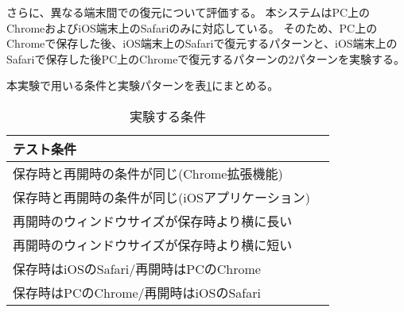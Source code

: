 さらに、異なる端末間での復元について評価する。
本システムはPC上のChromeおよびiOS端末上のSafariのみに対応している。
そのため、PC上のChromeで保存した後、iOS端末上のSafariで復元するパターンと、iOS端末上のSafariで保存した後PC上のChromeで復元するパターンの2パターンを実験する。

本実験で用いる条件と実験パターンを表\ref{tb:evl-scroll-position}にまとめる。

\begin{table}[htbp]
  \label{tb:evl-scroll-position}
  \caption{実験する条件}
  \begin{center}
    \begin{tabular}{|l|l|}
    \hline
    テスト条件  \\\hline\hline
    保存時と再開時の条件が同じ(Chrome拡張機能) \\ \hline
    保存時と再開時の条件が同じ(iOSアプリケーション) \\ \hline
    再開時のウィンドウサイズが保存時より横に長い  \\ \hline
    再開時のウィンドウサイズが保存時より横に短い  \\ \hline
    保存時はiOSのSafari/再開時はPCのChrome \\ \hline
    保存時はPCのChrome/再開時はiOSのSafari \\ \hline
    \end{tabular}
  \end{center}
\end{table}
